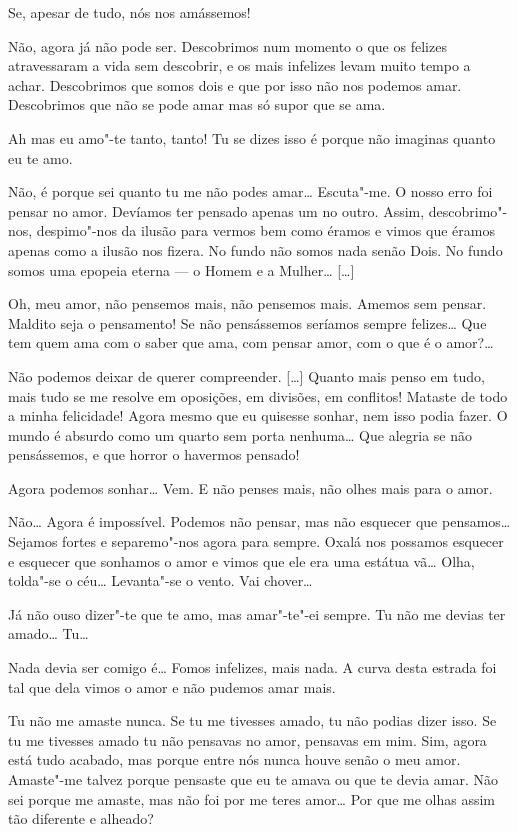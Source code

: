 Se, apesar de tudo, nós nos amássemos!

 Não, agora já não pode ser. Descobrimos num momento o que os
felizes atravessaram a vida sem descobrir, e os mais infelizes levam
muito tempo a achar. Descobrimos que somos dois e que por isso não
nos podemos amar. Descobrimos que não se pode amar mas só supor que
se ama.

 Ah mas eu amo"-te tanto, tanto! Tu se dizes isso é porque não
imaginas quanto eu te amo.

 Não, é porque sei quanto tu me não podes amar\ldots{}
Escuta"-me. O nosso erro foi pensar no amor. Devíamos ter pensado
apenas um no outro. Assim, descobrimo"-nos, despimo"-nos da ilusão para
vermos bem como éramos e vimos que éramos apenas como a ilusão nos
fizera. No fundo não somos nada senão Dois. No fundo somos uma
epopeia eterna --- o Homem e a Mulher\ldots{} [\ldots{}]

 Oh, meu amor, não pensemos mais, não pensemos mais. Amemos sem
pensar. Maldito seja o pensamento! Se não pensássemos seríamos sempre
felizes\ldots{} Que tem quem ama com o saber que ama, com pensar amor, com
o que é o amor?\ldots{}

 Não podemos deixar de querer compreender. [\ldots{}] Quanto mais penso
em tudo, mais tudo se me resolve em oposições, em divisões, em
conflitos! Mataste de todo a minha felicidade! Agora mesmo que eu
quisesse sonhar, nem isso podia fazer. O mundo é absurdo como um
quarto sem porta nenhuma\ldots{} Que alegria se não pensássemos, e que
horror o havermos pensado!

 Agora podemos sonhar\ldots{} Vem. E não penses mais, não olhes mais para
o amor.

 Não\ldots{} Agora é impossível. Podemos não pensar, mas não esquecer que
pensamos\ldots{} Sejamos fortes e separemo"-nos agora para sempre. Oxalá
nos possamos esquecer e esquecer que sonhamos o amor e vimos que ele
era uma estátua vã\ldots{} Olha, tolda"-se o céu\ldots{} Levanta"-se o vento. Vai
chover\ldots{}

 Já não ouso dizer"-te que te amo, mas amar"-te"-ei sempre. Tu não me
devias ter amado\ldots{} Tu\ldots{}

 Nada devia ser comigo é\ldots{} Fomos infelizes, mais nada. A curva
desta estrada foi tal que dela vimos o amor e não pudemos amar mais.

 Tu não me amaste nunca. Se tu me tivesses amado, tu não podias
dizer isso. Se tu me tivesses amado tu não pensavas no amor, pensavas
em mim. Sim, agora está tudo acabado, mas porque entre nós nunca
houve senão o meu amor. Amaste"-me talvez porque pensaste que eu te
amava ou que te devia amar. Não sei porque me amaste, mas não foi por
me teres amor\ldots{} Por que me olhas assim tão diferente e alheado?

